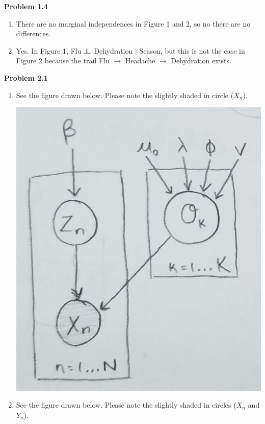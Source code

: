 \documentclass[12pt]{article}
\newcommand{\indep}{\rotatebox[origin=c]{90}{$\models$}}
\begin{document}
\pagebreak\textbf{Problem 1.4}
\begin{enumerate}
	\item There are no marginal independences in Figure 1 and 2, so no there are no differences.
	\item Yes. In Figure 1, Flu $\indep$ Dehydration $\vert$ Season, but this is not the case in Figure 2 because the trail Flu $\rightarrow$ Headache $\rightarrow$ Dehydration exists.
\end{enumerate}

\pagebreak\textbf{Problem 2.1}
\begin{enumerate}
	\item See the figure drawn below. Please note the slightly shaded in circle ($X_n$).
	
	\includegraphics[scale=0.2]{q2-sub1-part1-answer}
	
	\item See the figure drawn below. Please note the slightly shaded in circles ($X_n$ and $Y_n$).
	

\end{enumerate}
\end{document}

